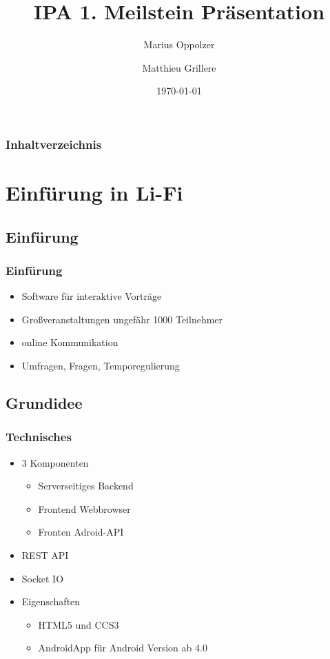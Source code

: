 \documentclass[german,a4paper]{beamer}
\title{IPA 1. Meilstein Pr\"{a}sentation}
\author{Marius Oppolzer \and Matthieu Grillere}
\date{\today}
\begin{document}
\maketitle{}
\begin{frame}
\frametitle{Inhaltverzeichnis}
\tableofcontents[pausesections]
\end{frame}
 
\section{Einf\"{u}rung in Li-Fi}
\subsection{Einf\"{u}rung}
\begin{frame} 
\frametitle{Einf\"{u}rung}
\begin{itemize}
  \item 
  Software f\"{u}r interaktive Vortr\"{a}ge
  \item
  Gro{\ss}veranstaltungen ungef\"{a}hr 1000 Teilnehmer
  \item
  online Kommunikation
  \item
  Umfragen, Fragen, Temporegulierung
\end{itemize}
\end{frame}

\subsection{Grundidee}
\begin{frame} 
\frametitle{Technisches}
\begin{itemize}
  \item 
  3 Komponenten
  \begin{itemize}
    \item
    Serverseitiges Backend
    \item
    Frontend Webbrowser
    \item
    Fronten Adroid-API
  \end{itemize}
  \item 
  REST API
  \item
  Socket IO
  \item
  Eigenschaften
  \begin{itemize}
    \item
    HTML5 und CCS3
    \item
    AndroidApp für Android Version ab 4.0
  \end{itemize}
\end{itemize}
\end{frame}
\end{document}
